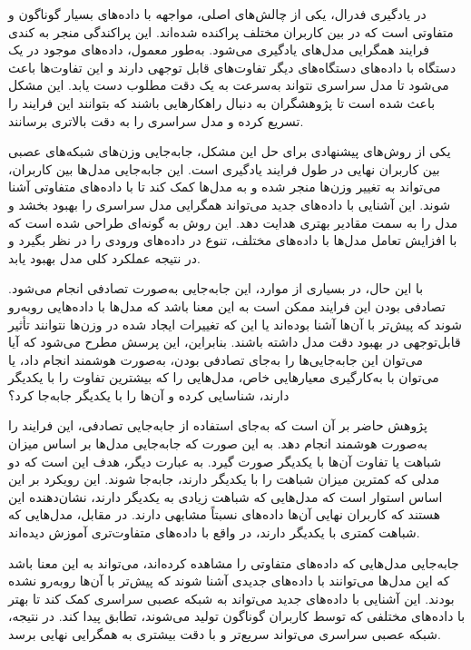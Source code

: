 در یادگیری فدرال، یکی از چالش‌های اصلی، مواجهه با داده‌های بسیار گوناگون و متفاوتی است که در بین کاربران مختلف پراکنده شده‌اند. این پراکندگی منجر به کندی فرایند همگرایی مدل‌های یادگیری می‌شود. به‌طور معمول، داده‌های موجود در یک دستگاه با داده‌های دستگاه‌های دیگر تفاوت‌های قابل توجهی دارند و این تفاوت‌ها باعث می‌شود تا مدل سراسری نتواند به‌سرعت به یک دقت مطلوب دست یابد. این مشکل باعث شده است تا پژوهشگران به دنبال راهکارهایی باشند که بتوانند این فرایند را تسریع کرده و مدل سراسری را به دقت بالاتری برسانند.

یکی از روش‌های پیشنهادی برای حل این مشکل، جابه‌جایی وزن‌های شبکه‌های عصبی بین کاربران نهایی در طول فرایند یادگیری است. این جابه‌جایی مدل‌ها بین کاربران، می‌تواند به تغییر وزن‌ها منجر شده و به مدل‌ها کمک کند تا با داده‌های متفاوتی آشنا شوند. این آشنایی با داده‌های جدید می‌تواند همگرایی مدل سراسری را بهبود بخشد و مدل را به سمت مقادیر بهتری هدایت دهد. این روش به گونه‌ای طراحی شده است که با افزایش تعامل مدل‌ها با داده‌های مختلف، تنوع در داده‌های ورودی را در نظر بگیرد و در نتیجه عملکرد کلی مدل بهبود یابد.

با این حال، در بسیاری از موارد، این جابه‌جایی به‌صورت تصادفی انجام می‌شود. تصادفی بودن این فرایند ممکن است به این معنا باشد که مدل‌ها با داده‌هایی روبه‌رو شوند که پیش‌تر با آن‌ها آشنا بوده‌اند یا این که تغییرات ایجاد شده در وزن‌ها نتوانند تأثیر قابل‌توجهی در بهبود دقت مدل داشته باشند. بنابراین، این پرسش مطرح می‌شود که آیا می‌توان این جابه‌جایی‌ها را به‌جای تصادفی بودن، به‌صورت هوشمند انجام داد، یا می‌توان با به‌کارگیری معیارهایی خاص، مدل‌هایی را که بیشترین تفاوت را با یکدیگر دارند، شناسایی کرده و آن‌ها را با یکدیگر جابه‌جا کرد؟

پژوهش حاضر بر آن است که به‌جای استفاده از جابه‌جایی تصادفی، این فرایند را به‌صورت هوشمند انجام دهد. به این صورت که جابه‌جایی مدل‌ها بر اساس میزان شباهت یا تفاوت آن‌ها با یکدیگر صورت گیرد. به عبارت دیگر، هدف این است که دو مدلی که کمترین میزان شباهت را با یکدیگر دارند، جابه‌جا شوند. این رویکرد بر این اساس استوار است که مدل‌هایی که شباهت زیادی به یکدیگر دارند، نشان‌دهنده این هستند که کاربران نهایی آن‌ها داده‌های نسبتاً مشابهی دارند. در مقابل، مدل‌هایی که شباهت کمتری با یکدیگر دارند، در واقع با داده‌های متفاوت‌تری آموزش دیده‌اند.

جابه‌جایی مدل‌هایی که داده‌های متفاوتی را مشاهده کرده‌اند، می‌تواند به این معنا باشد که این مدل‌ها می‌توانند با داده‌های جدیدی آشنا شوند که پیش‌تر با آن‌ها روبه‌رو نشده بودند. این آشنایی با داده‌های جدید می‌تواند به شبکه عصبی سراسری کمک کند تا بهتر با داده‌های مختلفی که توسط کاربران گوناگون تولید می‌شوند، تطابق پیدا کند. در نتیجه، شبکه عصبی سراسری می‌تواند سریع‌تر و با دقت بیشتری به همگرایی نهایی برسد.

